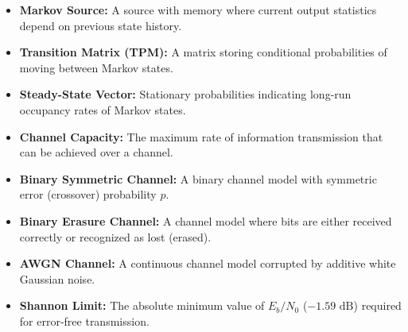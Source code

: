\documentclass[12pt,a4paper]{article}
\begin{document}
\begin{tcolorbox}[defbox, title={\textbf{One-Line Definitions}}]
\begin{itemize}[leftmargin=*, itemsep=2.5pt, topsep=0pt]
  \item \textbf{Markov Source:} A source with memory where current output statistics depend on previous state history.
  \item \textbf{Transition Matrix (TPM):} A matrix storing conditional probabilities of moving between Markov states.
  \item \textbf{Steady-State Vector:} Stationary probabilities indicating long-run occupancy rates of Markov states.
  \item \textbf{Channel Capacity:} The maximum rate of information transmission that can be achieved over a channel.
  \item \textbf{Binary Symmetric Channel:} A binary channel model with symmetric error (crossover) probability $p$.
  \item \textbf{Binary Erasure Channel:} A channel model where bits are either received correctly or recognized as lost (erased).
  \item \textbf{AWGN Channel:} A continuous channel model corrupted by additive white Gaussian noise.
  \item \textbf{Shannon Limit:} The absolute minimum value of $E_b/N_0$ ($-1.59\text{ dB}$) required for error-free transmission.
\end{itemize}
\end{tcolorbox}
\end{document}
